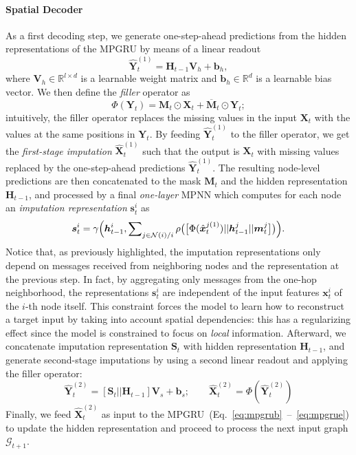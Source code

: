 \documentclass{article} \usepackage{iclr2022_conference,times}
\def\vb{{\bm{b}}}
\def\vh{{\bm{h}}}
\def\vm{{\bm{m}}}
\def\vs{{\bm{s}}}
\def\vx{{\bm{x}}}
\def\mH{{\bm{H}}}
\def\mM{{\bm{M}}}
\def\mS{{\bm{S}}}
\def\mV{{\bm{V}}}
\def\mX{{\bm{X}}}
\def\mY{{\bm{Y}}}
\def\gG{{\mathcal{G}}}
\def\gN{{\mathcal{N}}}
\def\sR{{\mathbb{R}}}
\begin{document}
\paragraph{Spatial Decoder} As a first decoding step, we generate one-step-ahead predictions from the hidden representations of the MPGRU by means of a linear readout
\begin{equation}
    \widehat\mY_{t}^{(1)} = \mH_{t-1} \mV_h + \vb_h,
\end{equation}
where $\mV_{h} \in \sR^{l \times d}$ is a learnable weight matrix and $\vb_{h} \in \sR^{d}$ is a learnable bias vector. We then define the \emph{filler} operator as
\begin{equation}
    \Phi(\mY_t) = \mM_t \odot \mX_t + \overline \mM_t \odot \mY_t;
\end{equation}
intuitively, the filler operator replaces the missing values in the input $\mX_t$ with the values at the same positions in $\mY_t$.
By feeding $\widehat\mY_{t}^{(1)}$ to the filler operator, we get the \textit{first-stage imputation} $\widehat\mX_{t}^{(1)}$ such that the output is $\mX_t$ with missing values replaced by the one-step-ahead predictions $\widehat\mY_{t}^{(1)}$. The resulting node-level predictions are then concatenated to the mask $\mM_t$ and the hidden representation $\mH_{t-1}$, and processed by a final \emph{one-layer} MPNN which computes for each node an \emph{imputation representation} $\vs^i_t$ as
\begin{equation}
    \vs^i_t =  \gamma\Big(\vh_{t-1}^i, \small{\footnotesize{\sum}_{\footnotesize{j \in \gN(i) / i}}} \, \rho\big(\big[ \Phi(\hat\vx_t^{j(1)})||\vh_{t-1}^j||\vm_t^j \big]\big)\Big) .
\end{equation}
Notice that, as previously highlighted, the imputation representations only depend on messages received from neighboring nodes and the representation at the previous step. In fact, by aggregating only messages from the one-hop neighborhood,
the representations $\vs^i_t$ are independent of the input features $\vx^i_t$ of the $i$-th node itself. This constraint forces the model to learn how to reconstruct a target input by taking into account spatial dependencies: this has a regularizing effect since the model is constrained to focus on \emph{local} information. Afterward, we concatenate imputation representation $\mS_{t}$ with hidden representation $\mH_{t-1}$, and generate second-stage imputations by using a second linear readout and applying the filler operator:
\begin{equation}
\widehat\mY_{t}^{(2)} = \left[ \mS_{t}||\mH_{t-1} \right] \mV_s + \vb_s;
\quad\quad
\widehat\mX^{(2)}_t = \Phi(\widehat\mY_{t}^{(2)})
\end{equation}
Finally, we feed $\widehat\mX_{t}^{(2)}$ as input to the MPGRU~(Eq.~\ref{eq:mpgrub}~--~\ref{eq:mpgrue}) to update the hidden representation and proceed to process the next input graph $\gG_{t+1}$.
\end{document}
